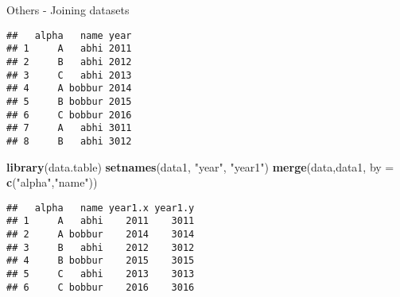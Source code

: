 \documentclass[ignorenonframetext,]{beamer}
\newenvironment{Shaded}{\begin{snugshade}}{\end{snugshade}}
\newcommand{\DataTypeTok}[1]{\textcolor[rgb]{0.13,0.29,0.53}{#1}}
\newcommand{\DecValTok}[1]{\textcolor[rgb]{0.00,0.00,0.81}{#1}}
\newcommand{\KeywordTok}[1]{\textcolor[rgb]{0.13,0.29,0.53}{\textbf{#1}}}
\newcommand{\NormalTok}[1]{#1}
\newcommand{\OperatorTok}[1]{\textcolor[rgb]{0.81,0.36,0.00}{\textbf{#1}}}
\newcommand{\StringTok}[1]{\textcolor[rgb]{0.31,0.60,0.02}{#1}}
\begin{document}
\begin{frame}[fragile]{Others - Joining datasets}
\protect\hypertarget{others---joining-datasets}{}

\begin{Shaded}
\end{Shaded}

\begin{verbatim}
##   alpha   name year
## 1     A   abhi 2011
## 2     B   abhi 2012
## 3     C   abhi 2013
## 4     A bobbur 2014
## 5     B bobbur 2015
## 6     C bobbur 2016
## 7     A   abhi 3011
## 8     B   abhi 3012
\end{verbatim}

\end{frame}

\begin{frame}[fragile]

\begin{Shaded}
\begin{Highlighting}[]
\KeywordTok{library}\NormalTok{(data.table)}
\KeywordTok{setnames}\NormalTok{(data1, }\StringTok{"year"}\NormalTok{, }\StringTok{"year1"}\NormalTok{)}
\KeywordTok{merge}\NormalTok{(data,data1, }\DataTypeTok{by =} \KeywordTok{c}\NormalTok{(}\StringTok{"alpha"}\NormalTok{,}\StringTok{"name"}\NormalTok{))}
\end{Highlighting}
\end{Shaded}

\begin{verbatim}
##   alpha   name year1.x year1.y
## 1     A   abhi    2011    3011
## 2     A bobbur    2014    3014
## 3     B   abhi    2012    3012
## 4     B bobbur    2015    3015
## 5     C   abhi    2013    3013
## 6     C bobbur    2016    3016
\end{verbatim}

\end{frame}
\end{document}
